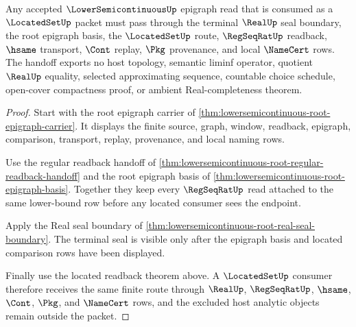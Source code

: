 \begin{theorem}
\label{thm:lowersemicontinuous-epigraph-locatedset-handoff}
Any accepted $\LowerSemicontinuousUp$ epigraph read that is consumed as a $\LocatedSetUp$ packet must pass through the terminal $\RealUp$ seal boundary, the root epigraph basis, the $\LocatedSetUp$ route, $\RegSeqRatUp$ readback, $\hsame$ transport, $\Cont$ replay, $\Pkg$ provenance, and local $\NameCert$ rows. The handoff exports no host topology, semantic liminf operator, quotient $\RealUp$ equality, selected approximating sequence, countable choice schedule, open-cover compactness proof, or ambient Real-completeness theorem.
\end{theorem}
\begin{proof}
Start with the root epigraph carrier of \autoref{thm:lowersemicontinuous-root-epigraph-carrier}. It displays the finite source, graph, window, readback, epigraph, comparison, transport, replay, provenance, and local naming rows.

Use the regular readback handoff of \autoref{thm:lowersemicontinuous-root-regular-readback-handoff} and the root epigraph basis of \autoref{thm:lowersemicontinuous-root-epigraph-basis}. Together they keep every $\RegSeqRatUp$ read attached to the same lower-bound row before any located consumer sees the endpoint.

Apply the Real seal boundary of \autoref{thm:lowersemicontinuous-root-real-seal-boundary}. The terminal seal is visible only after the epigraph basis and located comparison rows have been displayed.

Finally use the located readback theorem above. A $\LocatedSetUp$ consumer therefore receives the same finite route through $\RealUp$, $\RegSeqRatUp$, $\hsame$, $\Cont$, $\Pkg$, and $\NameCert$ rows, and the excluded host analytic objects remain outside the packet.
\end{proof}

